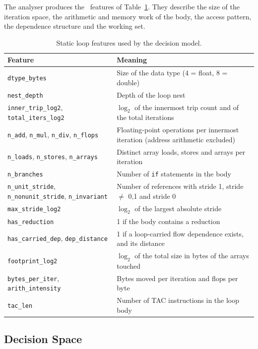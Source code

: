 \documentclass[12pt,a4paper]{article}
\begin{document}
The analyser produces the \numFeatures\ features of Table~\ref{tab:features}. They
describe the size of the iteration space, the arithmetic and memory work of the body,
the access pattern, the dependence structure and the working set.

\begin{table}[H]
\centering
\caption{Static loop features used by the decision model.}
\label{tab:features}
\footnotesize
\begin{tabularx}{\textwidth}{lX}
\toprule
\textbf{Feature} & \textbf{Meaning}\\
\midrule
\texttt{dtype\_bytes} & Size of the data type (4 = float, 8 = double)\\
\texttt{nest\_depth} & Depth of the loop nest\\
\texttt{inner\_trip\_log2}, \texttt{total\_iters\_log2} & $\log_2$ of the innermost trip count and of the total iterations\\
\texttt{n\_add}, \texttt{n\_mul}, \texttt{n\_div}, \texttt{n\_flops} & Floating-point operations per innermost iteration (address arithmetic excluded)\\
\texttt{n\_loads}, \texttt{n\_stores}, \texttt{n\_arrays} & Distinct array loads, stores and arrays per iteration\\
\texttt{n\_branches} & Number of \texttt{if} statements in the body\\
\texttt{n\_unit\_stride}, \texttt{n\_nonunit\_stride}, \texttt{n\_invariant} & Number of references with stride 1, stride $\neq$ 0,1 and stride 0\\
\texttt{max\_stride\_log2} & $\log_2$ of the largest absolute stride\\
\texttt{has\_reduction} & 1 if the body contains a reduction\\
\texttt{has\_carried\_dep}, \texttt{dep\_distance} & 1 if a loop-carried flow dependence exists, and its distance\\
\texttt{footprint\_log2} & $\log_2$ of the total size in bytes of the arrays touched\\
\texttt{bytes\_per\_iter}, \texttt{arith\_intensity} & Bytes moved per iteration and flops per byte\\
\texttt{tac\_len} & Number of TAC instructions in the loop body\\
\bottomrule
\end{tabularx}
\end{table}

\subsection{Decision Space}
\end{document}
